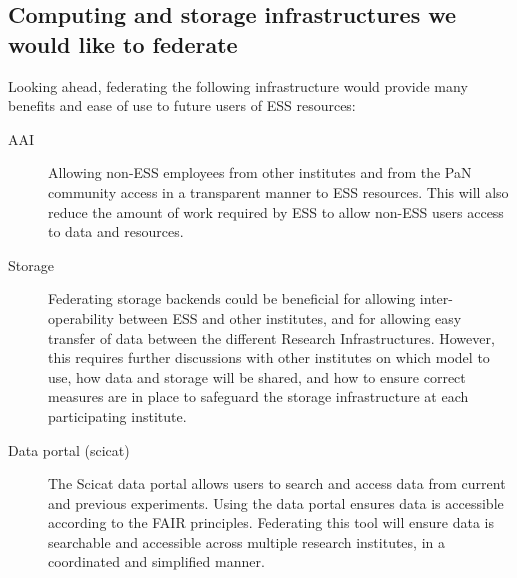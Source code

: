 \subsection{Computing and storage infrastructures we would like to federate}

Looking ahead, federating the following infrastructure would provide many benefits and ease of use to future users of ESS resources:

\begin{description}
  \item[AAI]
    Allowing non-ESS employees from other institutes and from the PaN community access in a transparent manner to ESS resources.
    This will also reduce the amount of work required by ESS to allow non-ESS users access to data and resources.
  \item[Storage]
    Federating storage backends could be beneficial for allowing inter-operability between ESS and other institutes, and for allowing easy transfer of data between the different Research Infrastructures.
    However, this requires further discussions with other institutes on which model to use, how data and storage will be shared, and how to ensure correct measures are in place to safeguard the storage infrastructure at each participating institute.
  \item[Data portal (scicat)]
    The Scicat data portal allows users to search and access data from current and previous experiments.
    Using the data portal ensures data is accessible according to the FAIR principles.
    Federating this tool will ensure data is searchable and accessible across multiple research institutes, in a coordinated and simplified manner.
\end{description}
